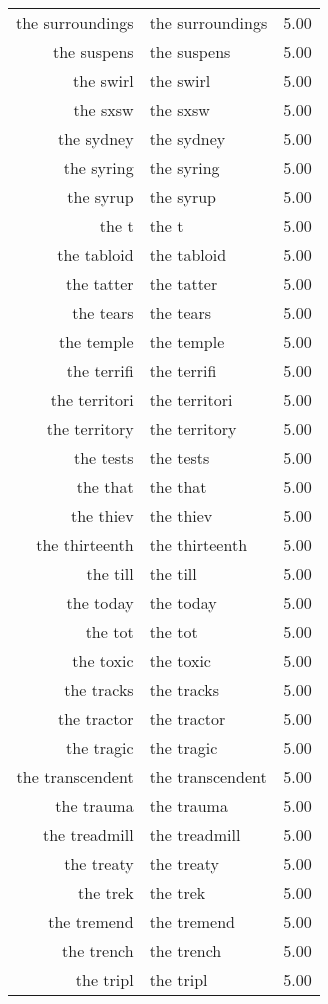 \begin{table}[ht]
\begin{tabular}{rlr}
  the surroundings & the surroundings & 5.00 \\ 
  the suspens & the suspens & 5.00 \\ 
  the swirl & the swirl & 5.00 \\ 
  the sxsw & the sxsw & 5.00 \\ 
  the sydney & the sydney & 5.00 \\ 
  the syring & the syring & 5.00 \\ 
  the syrup & the syrup & 5.00 \\ 
  the t & the t & 5.00 \\ 
  the tabloid & the tabloid & 5.00 \\ 
  the tatter & the tatter & 5.00 \\ 
  the tears & the tears & 5.00 \\ 
  the temple & the temple & 5.00 \\ 
  the terrifi & the terrifi & 5.00 \\ 
  the territori & the territori & 5.00 \\ 
  the territory & the territory & 5.00 \\ 
  the tests & the tests & 5.00 \\ 
  the that & the that & 5.00 \\ 
  the thiev & the thiev & 5.00 \\ 
  the thirteenth & the thirteenth & 5.00 \\ 
  the till & the till & 5.00 \\ 
  the today & the today & 5.00 \\ 
  the tot & the tot & 5.00 \\ 
  the toxic & the toxic & 5.00 \\ 
  the tracks & the tracks & 5.00 \\ 
  the tractor & the tractor & 5.00 \\ 
  the tragic & the tragic & 5.00 \\ 
  the transcendent & the transcendent & 5.00 \\ 
  the trauma & the trauma & 5.00 \\ 
  the treadmill & the treadmill & 5.00 \\ 
  the treaty & the treaty & 5.00 \\ 
  the trek & the trek & 5.00 \\ 
  the tremend & the tremend & 5.00 \\ 
  the trench & the trench & 5.00 \\ 
  the tripl & the tripl & 5.00 \\ 

\end{tabular}
\end{table}

